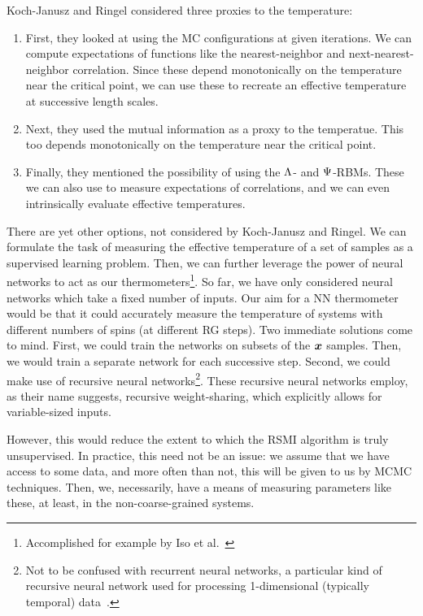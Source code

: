 Koch-Janusz and Ringel considered three proxies to the temperature:
\begin{enumerate}
\item First, they looked at using the MC configurations at given
  iterations. We can compute expectations of functions like the
  nearest-neighbor and next-nearest-neighbor correlation. Since these
  depend monotonically on the temperature near the critical point, we
  can use these to recreate an effective temperature at successive
  length scales.
\item Next, they used the mutual information as a proxy to the
  temperatue. This too depends monotonically on the temperature near
  the critical point.
\item Finally, they mentioned the possibility of using the $\L$- and
  $\P$-RBMs. These we can also use to measure expectations of
  correlations, and we can even intrinsically evaluate effective
  temperatures.
\end{enumerate}

There are yet other options, not considered by Koch-Janusz and
Ringel. We can formulate the task of measuring the effective
temperature of a set of samples as a supervised learning
problem. Then, we can further leverage the power of neural networks to
act as our thermometers\footnote{Accomplished for example by Iso et
  al.~\cite{iso}}. So far, we have only considered neural networks
which take a fixed number of inputs. Our aim for a NN thermometer
would be that it could accurately measure the temperature of systems
with different numbers of spins (at different RG steps). Two immediate
solutions come to mind. First, we could train the networks on subsets
of the $\bx$ samples. Then, we would train a separate network for each
successive step. Second, we could make use of recursive neural
networks\footnote{Not to be confused with recurrent neural networks, a
  particular kind of recursive neural network used for processing
  1-dimensional (typically temporal) data~\cite{}.}. These recursive
neural networks employ, as their name suggests, recursive
weight-sharing, which explicitly allows for variable-sized inputs.

However, this would reduce the extent to which the RSMI algorithm is
truly unsupervised. In practice, this need not be an issue: we assume
that we have access to some data, and more often than not, this will
be given to us by MCMC techniques. Then, we, necessarily, have a means
of measuring parameters like these, at least, in the
non-coarse-grained systems.

